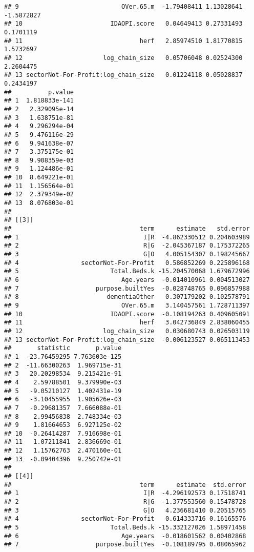 \documentclass[]{article}
\begin{document}
\begin{verbatim}
## 9                            OVer.65.m  -1.79408411 1.13028641  -1.5872827
## 10                        IDAOPI.score   0.04649413 0.27331493   0.1701119
## 11                                herf   2.85974510 1.81770815   1.5732697
## 12                      log_chain_size   0.05706048 0.02524300   2.2604475
## 13 sectorNot-For-Profit:log_chain_size   0.01224118 0.05028837   0.2434197
##          p.value
## 1  1.818833e-141
## 2   2.329095e-14
## 3   1.638751e-81
## 4   9.296294e-04
## 5   9.476116e-29
## 6   9.941638e-07
## 7   3.375175e-01
## 8   9.908359e-03
## 9   1.124486e-01
## 10  8.649221e-01
## 11  1.156564e-01
## 12  2.379349e-02
## 13  8.076803e-01
## 
## [[3]]
##                                   term      estimate   std.error
## 1                                  I|R  -4.862330512 0.204603989
## 2                                  R|G  -2.045367187 0.175372265
## 3                                  G|O   4.005154307 0.198245667
## 4                 sectorNot-For-Profit   0.586852269 0.225896168
## 5                         Total.Beds.k -15.204570068 1.679672996
## 6                            Age.years  -0.014010961 0.004513027
## 7                     purpose.builtYes  -0.028748765 0.096857988
## 8                        dementiaOther   0.307179202 0.102578791
## 9                            OVer.65.m   3.140457561 1.728711397
## 10                        IDAOPI.score  -0.108194263 0.409605091
## 11                                herf   3.042736849 2.838060455
## 12                      log_chain_size   0.030680743 0.026503119
## 13 sectorNot-For-Profit:log_chain_size  -0.006123527 0.065113453
##       statistic       p.value
## 1  -23.76459295 7.763603e-125
## 2  -11.66300263  1.969715e-31
## 3   20.20298534  9.215421e-91
## 4    2.59788501  9.379990e-03
## 5   -9.05210127  1.402431e-19
## 6   -3.10455955  1.905626e-03
## 7   -0.29681357  7.666088e-01
## 8    2.99456838  2.748334e-03
## 9    1.81664653  6.927125e-02
## 10  -0.26414287  7.916698e-01
## 11   1.07211841  2.836669e-01
## 12   1.15762763  2.470160e-01
## 13  -0.09404396  9.250742e-01
## 
## [[4]]
##                                   term      estimate  std.error
## 1                                  I|R  -4.296192573 0.17518741
## 2                                  R|G  -1.377553560 0.15478728
## 3                                  G|O   4.236681410 0.20515765
## 4                 sectorNot-For-Profit   0.614333716 0.16165576
## 5                         Total.Beds.k -15.332127026 1.58971458
## 6                            Age.years  -0.018601562 0.00402868
## 7                     purpose.builtYes  -0.108189795 0.08065962

\end{verbatim}
\end{document}
